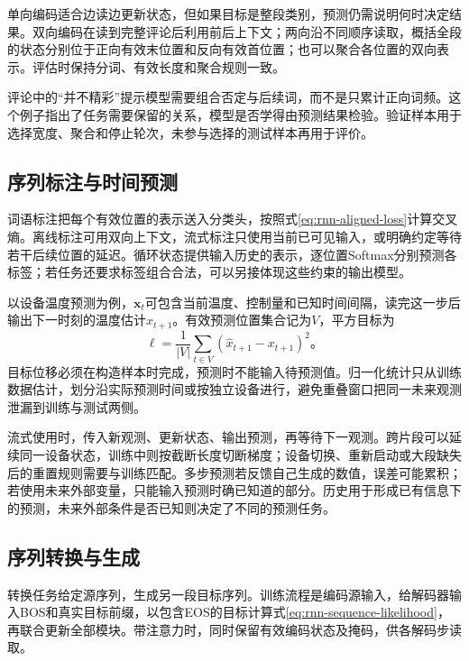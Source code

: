 单向编码适合边读边更新状态，但如果目标是整段类别，预测仍需说明何时决定结果。双向编码在读到完整评论后利用前后上下文；两向沿不同顺序读取，概括全段的状态分别位于正向有效末位置和反向有效首位置；也可以聚合各位置的双向表示。评估时保持分词、有效长度和聚合规则一致。

评论中的“并不精彩”提示模型需要组合否定与后续词，而不是只累计正向词频。这个例子指出了任务需要保留的关系，模型是否学得由预测结果检验。验证样本用于选择宽度、聚合和停止轮次，未参与选择的测试样本再用于评价。

\subsection{序列标注与时间预测}
\label{sec:rnn-application-aligned}

词语标注把每个有效位置的表示送入分类头，按照式\eqref{eq:rnn-aligned-loss}计算交叉熵。离线标注可用双向上下文，流式标注只使用当前已可见输入，或明确约定等待若干后续位置的延迟。循环状态提供输入历史的表示，逐位置Softmax分别预测各标签；若任务还要求标签组合合法，可以另接体现这些约束的输出模型。

以设备温度预测为例，$\bm{x}_t$可包含当前温度、控制量和已知时间间隔，读完这一步后输出下一时刻的温度估计$\widehat x_{t+1}$。有效预测位置集合记为$V$，平方目标为
\begin{equation}
  \ell=\frac{1}{|V|}\sum_{t\in V}
      (\widehat x_{t+1}-x_{t+1})^2\text{。}
  \label{eq:rnn-forecast-loss}
\end{equation}
目标位移必须在构造样本时完成，预测时不能输入待预测值。归一化统计只从训练数据估计，划分沿实际预测时间或按独立设备进行，避免重叠窗口把同一未来观测泄漏到训练与测试两侧。

流式使用时，传入新观测、更新状态、输出预测，再等待下一观测。跨片段可以延续同一设备状态，训练中则按截断长度切断梯度；设备切换、重新启动或大段缺失后的重置规则需要与训练匹配。多步预测若反馈自己生成的数值，误差可能累积；若使用未来外部变量，只能输入预测时确已知道的部分。历史用于形成已有信息下的预测，未来外部条件是否已知则决定了不同的预测任务。

\subsection{序列转换与生成}
\label{sec:rnn-application-generation}

转换任务给定源序列，生成另一段目标序列。训练流程是编码源输入，给解码器输入BOS和真实目标前缀，以包含EOS的目标计算式\eqref{eq:rnn-sequence-likelihood}，再联合更新全部模块。带注意力时，同时保留有效编码状态及掩码，供各解码步读取。

